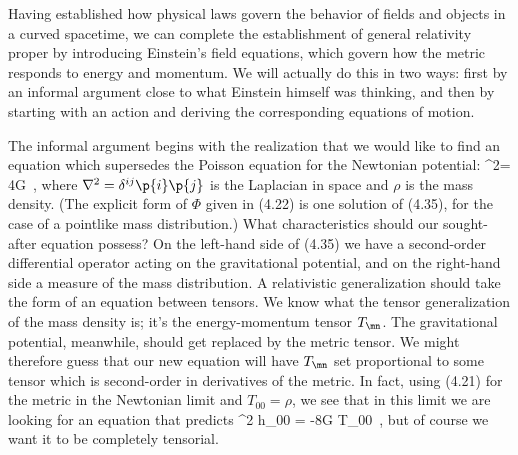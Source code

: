 Having established how physical laws govern the behavior of
fields and objects in a curved spacetime, we can complete the
establishment of general relativity proper by introducing Einstein's
field equations, which govern how the metric responds to energy
and momentum.  We will actually do this in two ways: first by an
informal argument close to what Einstein himself was thinking,
and then by starting with an action and deriving the 
corresponding equations of motion.

The informal argument begins with the realization that we would 
like to find an equation which supersedes the Poisson equation for
the Newtonian potential:
\be
  \nabla^2\Phi = 4\pi G\rho\ ,\label{4.35}
\ee
where $\nabla^2 = \delta^{ij}\p{i}\p{j}$ is the Laplacian in 
space and $\rho$ is the mass density.  (The explicit form of
$\Phi$ given in (4.22) is one solution of (4.35),
for the case of a pointlike mass distribution.)  What characteristics
should our sought-after equation possess?  On the left-hand side
of (4.35) we have a second-order differential operator acting on the
gravitational potential, and on the right-hand side a measure of
the mass distribution.  A relativistic generalization should take
the form of an equation between tensors.  We know what the tensor
generalization of the mass density is; it's the energy-momentum
tensor $T_\mn$.  The gravitational potential, meanwhile, should
get replaced by the metric tensor.  We might therefore guess
that our new equation will have $T_\mn$ set proportional to some
tensor which is second-order in derivatives of the metric.  In
fact, using (4.21) for the metric in the Newtonian limit and
$T_{00}=\rho$, we see that in this limit we are looking for an
equation that predicts
\be
  \nabla^2 h_{00} = -8\pi G T_{00}\ ,\label{4.36}
\ee
but of course we want it to be completely tensorial.

